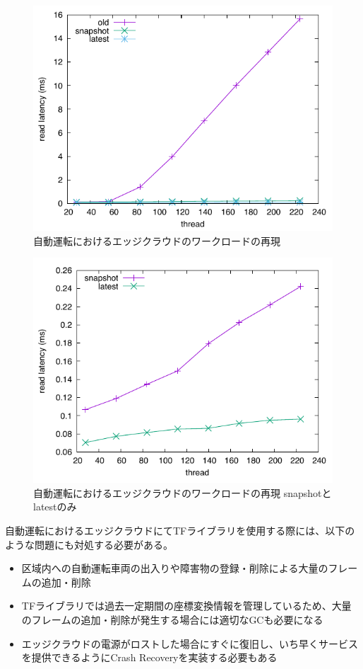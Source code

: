 \documentclass[a4paper]{jreport}	%
\begin{document}
\begin{figure}[h] 
\centering
\includegraphics[width=15cm]{car}
\caption{自動運転におけるエッジクラウドのワークロードの再現}
\label{fig:car-read-latency}
\end{figure}


\begin{figure}[h] 
\centering
\includegraphics[width=15cm]{car2}
\caption{自動運転におけるエッジクラウドのワークロードの再現 snapshotとlatestのみ}
\label{fig:car-read-latency2}
\end{figure}


自動運転におけるエッジクラウドにてTFライブラリを使用する際には、以下のような問題にも対処する必要がある。
\begin{itemize}     
	\item 区域内への自動運転車両の出入りや障害物の登録・削除による大量のフレームの追加・削除
	\item TFライブラリでは過去一定期間の座標変換情報を管理しているため、大量のフレームの追加・削除が発生する場合には適切なGCも必要になる
	\item エッジクラウドの電源がロストした場合にすぐに復旧し、いち早くサービスを提供できるようにCrash Recoveryを実装する必要もある
\end{itemize}
\end{document}
